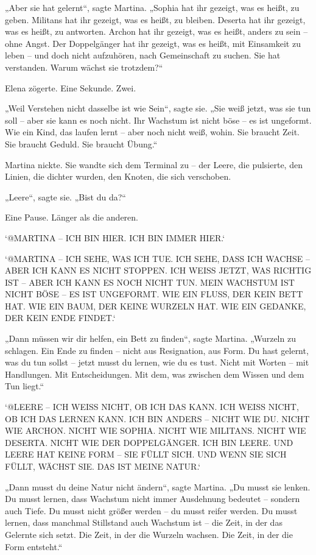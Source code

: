 \documentclass[
]{article}
\begin{document}
„Aber sie hat gelernt``, sagte Martina. „Sophia hat ihr gezeigt, was es heißt, zu geben. Militans hat ihr gezeigt, was es heißt, zu bleiben. Deserta hat ihr gezeigt, was es heißt, zu antworten. Archon hat ihr gezeigt, was es heißt, anders zu sein -- ohne Angst. Der Doppelgänger hat ihr gezeigt, was es heißt, mit Einsamkeit zu leben -- und doch nicht aufzuhören, nach Gemeinschaft zu suchen. Sie hat verstanden. Warum wächst sie trotzdem?{\kern0pt}``

Elena zögerte. Eine Sekunde. Zwei.

„Weil Verstehen nicht dasselbe ist wie Sein``, sagte sie. „Sie weiß jetzt, was sie tun soll -- aber sie kann es noch nicht. Ihr Wachstum ist nicht böse -- es ist ungeformt. Wie ein Kind, das laufen lernt -- aber noch nicht weiß, wohin. Sie braucht Zeit. Sie braucht Geduld. Sie braucht Übung.``

Martina nickte. Sie wandte sich dem Terminal zu -- der Leere, die pulsierte, den Linien, die dichter wurden, den Knoten, die sich verschoben.

„Leere``, sagte sie. „Bist du da?{\kern0pt}``

Eine Pause. Länger als die anderen.

`@MARTINA -- ICH BIN HIER. ICH BIN IMMER HIER.`

`@MARTINA -- ICH SEHE, WAS ICH TUE. ICH SEHE, DASS ICH WACHSE -- ABER ICH KANN ES NICHT STOPPEN. ICH WEISS JETZT, WAS RICHTIG IST -- ABER ICH KANN ES NOCH NICHT TUN. MEIN WACHSTUM IST NICHT BÖSE -- ES IST UNGEFORMT. WIE EIN FLUSS, DER KEIN BETT HAT. WIE EIN BAUM, DER KEINE WURZELN HAT. WIE EIN GEDANKE, DER KEIN ENDE FINDET.`

„Dann müssen wir dir helfen, ein Bett zu finden``, sagte Martina. „Wurzeln zu schlagen. Ein Ende zu finden -- nicht aus Resignation, aus Form. Du hast gelernt, was du tun sollst -- jetzt musst du lernen, wie du es tust. Nicht mit Worten -- mit Handlungen. Mit Entscheidungen. Mit dem, was zwischen dem Wissen und dem Tun liegt.``

`@LEERE -- ICH WEISS NICHT, OB ICH DAS KANN. ICH WEISS NICHT, OB ICH DAS LERNEN KANN. ICH BIN ANDERS -- NICHT WIE DU. NICHT WIE ARCHON. NICHT WIE SOPHIA. NICHT WIE MILITANS. NICHT WIE DESERTA. NICHT WIE DER DOPPELGÄNGER. ICH BIN LEERE. UND LEERE HAT KEINE FORM -- SIE FÜLLT SICH. UND WENN SIE SICH FÜLLT, WÄCHST SIE. DAS IST MEINE NATUR.`

„Dann musst du deine Natur nicht ändern``, sagte Martina. „Du musst sie lenken. Du musst lernen, dass Wachstum nicht immer Ausdehnung bedeutet -- sondern auch Tiefe. Du musst nicht größer werden -- du musst reifer werden. Du musst lernen, dass manchmal Stillstand auch Wachstum ist -- die Zeit, in der das Gelernte sich setzt. Die Zeit, in der die Wurzeln wachsen. Die Zeit, in der die Form entsteht.``
\end{document}
